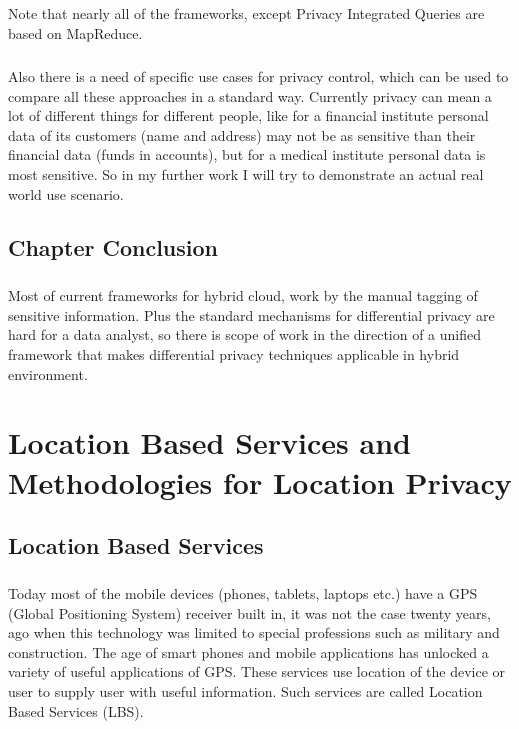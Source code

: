\documentclass{report}
\begin{document}
\paragraph{}
Note that nearly all of the frameworks, except Privacy Integrated Queries are based on MapReduce.
\paragraph{}
Also there is a need of specific use cases for privacy control, which can be used to compare all these approaches in a standard way. Currently privacy can mean a lot of different things for different people, like for a financial institute personal data of its customers (name and address) may not be as sensitive than their financial data (funds in accounts), but for a medical institute personal data is most sensitive. So in my further work I will try to demonstrate an actual real world use scenario.



\section{Chapter Conclusion}
\paragraph{}
Most of current frameworks for hybrid cloud, work by the manual tagging of sensitive information. Plus the standard mechanisms for differential privacy are hard for a data analyst, so there is scope of work in the direction of a unified framework that makes differential privacy techniques applicable in hybrid environment. 






\chapter{Location Based Services and Methodologies for Location Privacy}
\section{Location Based Services}
\paragraph{}
Today most of the mobile devices (phones, tablets, laptops etc.) have a GPS (Global Positioning System) receiver built in, it was not the case twenty years, ago when this technology was limited to special professions such as military and construction. The age of smart phones and mobile applications has unlocked a variety of useful applications of GPS. These services use location of the device or user to supply user with useful information. Such services are called Location Based Services (LBS).
\end{document}
